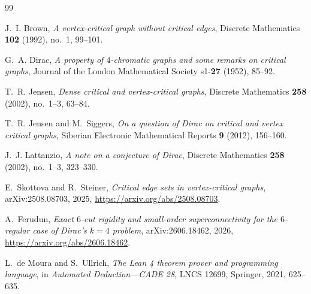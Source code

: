 \documentclass[10pt]{amsart}
\theoremstyle{definition}
\begin{document}
{\small
\begin{thebibliography}{99}

J.~I. Brown,
\emph{A vertex-critical graph without critical edges},
Discrete Mathematics \textbf{102} (1992), no.~1, 99--101.

G.~A. Dirac,
\emph{A property of $4$-chromatic graphs and some remarks on critical graphs},
Journal of the London Mathematical Society s1-\textbf{27} (1952), 85--92.

T.~R. Jensen,
\emph{Dense critical and vertex-critical graphs},
Discrete Mathematics \textbf{258} (2002), no.~1--3, 63--84.

T.~R. Jensen and M.~Siggers,
\emph{On a question of Dirac on critical and vertex critical graphs},
Siberian Electronic Mathematical Reports \textbf{9} (2012), 156--160.

J.~J. Lattanzio,
\emph{A note on a conjecture of Dirac},
Discrete Mathematics \textbf{258} (2002), no.~1--3, 323--330.

E.~Skottova and R.~Steiner,
\emph{Critical edge sets in vertex-critical graphs},
arXiv:2508.08703, 2025,
\url{https://arxiv.org/abs/2508.08703}.

A.~Ferudun,
\emph{Exact $6$-cut rigidity and small-order superconnectivity for the
$6$-regular case of Dirac's $k=4$ problem},
arXiv:2606.18462, 2026,
\url{https://arxiv.org/abs/2606.18462}.

L.~de Moura and S.~Ullrich,
\emph{The Lean 4 theorem prover and programming language},
in \emph{Automated Deduction---CADE 28}, LNCS 12699, Springer, 2021,
625--635.

\end{thebibliography}
}
\end{document}
